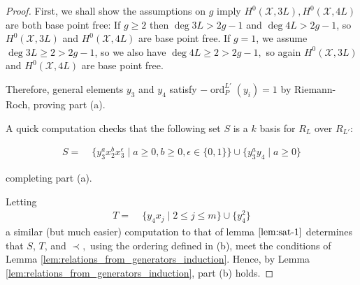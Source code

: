 \documentclass{amsart}
\theoremstyle{plain}
\theoremstyle{definition}
\theoremstyle{remark}
\numberwithin{equation}{section}
\DeclareMathOperator{\ord}{ord}
\newcommand\sx{\mathscr X}
\newcommand{\halfcan}{L}
\DeclareMathOperator{\initial}{in_\prec}
\begin{document}
\begin{proof}
First, we shall show the assumptions on $g$ imply $H^0(\sx, 3L), H^0(\sx, 4L)$ are both base point free: If $g \geq 2$ then $\deg 3L > 2g - 1$  and $\deg 4L > 2g - 1$, so $H^0(\sx, 3L)$ and $H^0(\sx, 4L)$ are base point free. If $g = 1$, we assume $\deg 3L \geq 2 > 2g - 1$, so we also have $\deg 4L \geq 2 > 2g - 1,$ so again $H^0(\sx, 3L)$ and $H^0(\sx, 4L)$ are base point free. 

Therefore, general elements $y_3$ and $y_4$ satisfy $-\ord_P^{\halfcan'}(y_i) = 1$ by Riemann-Roch, proving part (a).

A quick computation checks that
the following set $S$ is a $k$ basis for $R_\halfcan$ over $R_{\halfcan'}$:

\begin{align}
\label{eqn:sat_two_add_generator}
	S =	& \; \{ y_3^ax_2^b x_3^\epsilon \mid a \geq 0, b 
		\geq 0, \epsilon \in \{0, 1\}\} \cup \{ y_3^ay_4 \mid a \geq 0 \}
\end{align}

\noindent
completing part (a).

Letting
\begin{align*}
	T =   &\; \{ y_4 x_j \mid 2 \leq j \leq m \}\cup \{ y_4^2 \}
\end{align*}
a similar (but much easier) computation to that of lemma $\ref{lem:sat-1}$ determines that $S$, $T$, and $\prec,$ using the ordering defined in (b), meet the conditions of 
Lemma \ref{lem:relations_from_generators_induction}. 
Hence, by Lemma \ref{lem:relations_from_generators_induction}, part (b) holds.



\end{proof}
\end{document}
